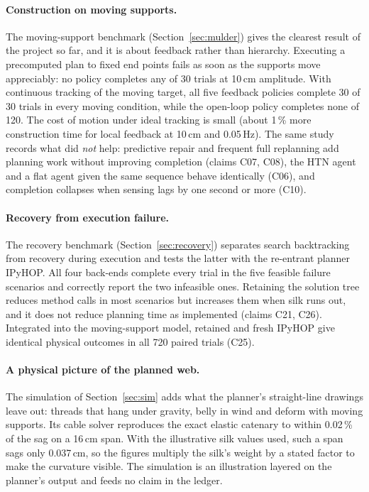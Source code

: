 \paragraph{Construction on moving supports.}
The moving-support benchmark (Section~\ref{sec:mulder}) gives the clearest result of the project so far, and
it is about feedback rather than hierarchy. Executing a precomputed plan to fixed end points fails as soon as
the supports move appreciably: no policy completes any of 30 trials at 10\,cm amplitude. With continuous
tracking of the moving target, all five feedback policies complete 30 of 30 trials in every moving condition,
while the open-loop policy completes none of 120. The cost of motion under ideal tracking is small (about
1\,\% more construction time for local feedback at 10\,cm and 0.05\,Hz). The same study records what did
\emph{not} help: predictive repair and frequent full replanning add planning work without improving
completion (claims C07, C08), the HTN agent and a flat agent given the same sequence behave identically
(C06), and completion collapses when sensing lags by one second or more (C10).

\paragraph{Recovery from execution failure.}
The recovery benchmark (Section~\ref{sec:recovery}) separates search backtracking from recovery during
execution and tests the latter with the re-entrant planner IPyHOP. All four back-ends complete every trial
in the five feasible failure scenarios and correctly report the two infeasible ones. Retaining the solution
tree reduces method calls in most scenarios but increases them when silk runs out, and it does not reduce
planning time as implemented (claims C21, C26). Integrated into the moving-support model, retained and fresh
IPyHOP give identical physical outcomes in all 720 paired trials (C25).

\paragraph{A physical picture of the planned web.}
The simulation of Section~\ref{sec:sim} adds what the planner's straight-line drawings leave out: threads
that hang under gravity, belly in wind and deform with moving supports. Its cable solver reproduces the exact elastic catenary to within 0.02\,\% of the sag on a
16\,cm span. With the illustrative silk values used, such a span sags only 0.037\,cm, so the figures
multiply the silk's weight by a stated factor to make the curvature visible. The simulation is an
illustration layered on the planner's output and feeds no claim in the ledger.


